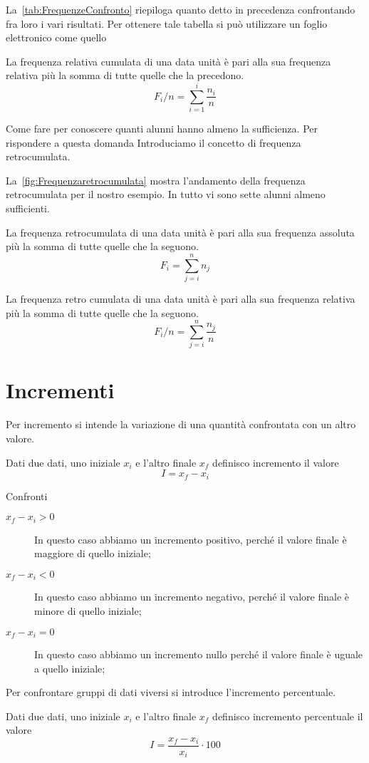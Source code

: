 La~\vref{tab:FrequenzeConfronto} riepiloga quanto detto in precedenza confrontando fra loro i vari risultati. Per ottenere tale tabella si può utilizzare un foglio elettronico come quello~
\begin{defn}
	La frequenza relativa cumulata  di una data unità è pari alla sua frequenza relativa più la somma di tutte quelle che la  precedono.
	\[F_{i}/n=\sum_{i=1}^{i}\dfrac{n_{i}}{n}\]
\end{defn}
Come fare per conoscere quanti alunni hanno almeno la sufficienza. Per rispondere a questa domanda Introduciamo il concetto di frequenza retrocumulata.\par  La~\vref{fig:Frequenzaretrocumulata} mostra l'andamento della frequenza retrocumulata per il nostro esempio. In tutto vi sono sette alunni almeno sufficienti.
\begin{defn}
	La frequenza retrocumulata di una data unità è pari alla sua frequenza assoluta più la somma di tutte quelle che la seguono.\[F_{i}=\sum_{j=i}^{n}n_{j}\]
\end{defn}

\begin{defn}
	La frequenza retro cumulata di una data unità è pari alla sua frequenza relativa più la somma di tutte quelle che la  seguono.	\[F_{i}/n=\sum_{j=i}^{n}\dfrac{n_{j}}{n}\]
\end{defn}
 \section{Incrementi }
 Per incremento si intende la variazione di una quantità confrontata con un altro valore.
 \begin{defn}[Incremento]
 	Dati due dati, uno iniziale $x_i$ e l'altro finale $x_f$ definisco incremento il valore  \[I=x_f-x_i\]
 \end{defn}
 \begin{commento}{Confronti}
 	\begin{description}
 		\item[$x_f-x_i>0$] In questo caso abbiamo un incremento positivo, perché il valore finale è maggiore di quello iniziale;
 		\item[$x_f-x_i<0$] In questo caso abbiamo un incremento negativo, perché il valore finale è minore di quello  iniziale;
 		\item[$x_f-x_i=0$] In questo caso abbiamo un incremento nullo perché il valore finale è uguale a quello  iniziale;
 	\end{description}
 \end{commento}
Per confrontare gruppi di dati viversi si introduce l'incremento percentuale.
\begin{defn}
	Dati due dati, uno iniziale $x_i$ e l'altro finale $x_f$ definisco incremento percentuale il valore  \[I=\dfrac{x_f-x_i}{x_i}\cdot 100\]
\end{defn} 